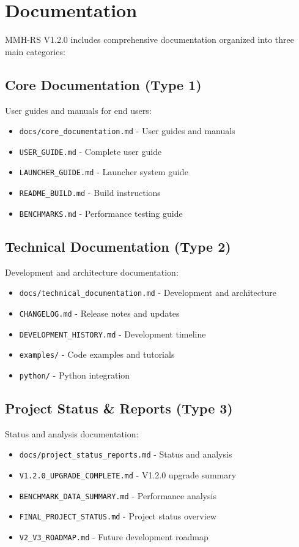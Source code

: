 \documentclass[11pt,a4paper]{article}
\begin{document}
	\section{Documentation}
	\label{sec:documentation}
	
	MMH-RS V1.2.0 includes comprehensive documentation organized into three main categories:
	
	\subsection{Core Documentation (Type 1)}
	User guides and manuals for end users:
	\begin{itemize}
		\item \texttt{docs/core\_documentation.md} - User guides and manuals
		\item \texttt{USER\_GUIDE.md} - Complete user guide
		\item \texttt{LAUNCHER\_GUIDE.md} - Launcher system guide
		\item \texttt{README\_BUILD.md} - Build instructions
		\item \texttt{BENCHMARKS.md} - Performance testing guide
	\end{itemize}
	
	\subsection{Technical Documentation (Type 2)}
	Development and architecture documentation:
	\begin{itemize}
		\item \texttt{docs/technical\_documentation.md} - Development and architecture
		\item \texttt{CHANGELOG.md} - Release notes and updates
		\item \texttt{DEVELOPMENT\_HISTORY.md} - Development timeline
		\item \texttt{examples/} - Code examples and tutorials
		\item \texttt{python/} - Python integration
	\end{itemize}
	
	\subsection{Project Status \& Reports (Type 3)}
	Status and analysis documentation:
	\begin{itemize}
		\item \texttt{docs/project\_status\_reports.md} - Status and analysis
		\item \texttt{V1.2.0\_UPGRADE\_COMPLETE.md} - V1.2.0 upgrade summary
		\item \texttt{BENCHMARK\_DATA\_SUMMARY.md} - Performance analysis
		\item \texttt{FINAL\_PROJECT\_STATUS.md} - Project status overview
		\item \texttt{V2\_V3\_ROADMAP.md} - Future development roadmap
	\end{itemize}
	
\end{document}
